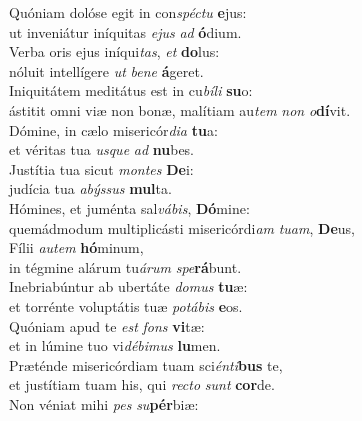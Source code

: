 \evenverse Quóniam dolóse egit in con\textit{spé}\textit{ctu} \textbf{e}jus:~\*\\
\evenverse ut inveniátur iníquitas \textit{e}\textit{jus} \textit{ad} \textbf{ó}dium.\\
\oddverse Verba oris ejus iníqui\textit{tas}, \textit{et} \textbf{do}lus:~\*\\
\oddverse nóluit intellígere \textit{ut} \textit{be}\textit{ne} \textbf{á}geret.\\
\evenverse Iniquitátem meditátus est in cu\textit{bí}\textit{li} \textbf{su}o:~\*\\
\evenverse ástitit omni viæ non bonæ, malítiam au\textit{tem} \textit{non} \textit{o}\textbf{dí}vit.\\
\oddverse Dómine, in cælo misericór\textit{di}\textit{a} \textbf{tu}a:~\*\\
\oddverse et véritas tua \textit{us}\textit{que} \textit{ad} \textbf{nu}bes.\\
\evenverse Justítia tua sicut \textit{mon}\textit{tes} \textbf{De}i:~\*\\
\evenverse judícia tua \textit{a}\textit{býs}\textit{sus} \textbf{mul}ta.\\
\oddverse Hómines, et juménta sal\textit{vá}\textit{bis}, \textbf{Dó}mine:~\*\\
\oddverse quemádmodum multiplicásti misericórdi\textit{am} \textit{tu}\textit{am}, \textbf{De}us,\\
\evenverse Fílii \textit{au}\textit{tem} \textbf{hó}minum,~\*\\
\evenverse in tégmine alárum tu\textit{á}\textit{rum} \textit{spe}\textbf{rá}bunt.\\
\oddverse Inebriabúntur ab ubertáte \textit{do}\textit{mus} \textbf{tu}æ:~\*\\
\oddverse et torrénte voluptátis tuæ \textit{po}\textit{tá}\textit{bis} \textbf{e}os.\\
\evenverse Quóniam apud te \textit{est} \textit{fons} \textbf{vi}tæ:~\*\\
\evenverse et in lúmine tuo vi\textit{dé}\textit{bi}\textit{mus} \textbf{lu}men.\\
\oddverse Præténde misericórdiam tuam sci\textit{én}\textit{ti}\textbf{bus} te,~\*\\
\oddverse et justítiam tuam his, qui \textit{re}\textit{cto} \textit{sunt} \textbf{cor}de.\\
\evenverse Non véniat mihi \textit{pes} \textit{su}\textbf{pér}biæ:~\*\\
